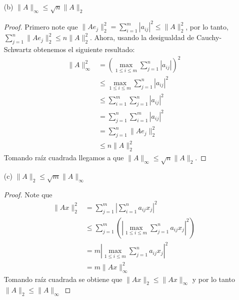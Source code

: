 \begin{enumerate}
\begin{proof}
    Por último, note que las componentes de la diagonal de $A^TA$ son de la forma $u_{jj}=\sum_{i=1}^m a_{ij}^2$, por lo tanto la traza de $A^TA$ es
    \[
    \sum_{j=1}^n\sum_{i=1}^{m}|a_{ij}|^2=\|A\|_F^2
    \]
    y ya que la traza de una matriz es igual a la suma de sus valores propios, y como $A^TA$ es semidefinida positiva, obtenemos que: 
    \begin{align*}
    \lambda_{max}(A^TA)&\leq \text{tr}(A^TA) \\
    \sqrt{\lambda_{max}(A^TA)} & \leq \sqrt{\text{tr}(A^TA)}\\ 
    \|A\|_2\ & \leq \|A\|_F
    \end{align*}
    \end{proof}
    \item[(b)] $\|A\|_\infty \leq \sqrt{n} \|A\|_2$
    \begin{proof}
    Primero note que $\|Ae_j\|_2^2=\sum_{i=1}^m |a_{ij}|^2\leq \|A\|_2^2$, por lo tanto, $\sum_{j=1}^n \|Ae_j\|_2^2\leq n\|A\|_2^2$. Ahora, usando la desigualdad de Cauchy-Schwartz obtenemos el siguiente resultado:
    \begin{align*}
    \|A\|_\infty^{2} & =\left(\max_{1\leq i \leq m}{\sum_{j=1}^n|a_{ij}|}\right)^2\\ 
        &\leq \max_{1\leq i \leq m}{\sum_{j=1}^n|a_{ij}|^2}\\   
        &\leq \sum_{i=1}^m\sum_{j=1}^{n}|a_{ij}|^2\\ 
        &= \sum_{j=1}^n\sum_{i=1}^{m}|a_{ij}|^2\\
        &= \sum_{j=1}^n \|Ae_j\|_2^2\\
        &\leq n\|A\|_2^2
    \end{align*}
    Tomando raíz cuadrada llegamos a que $\|A\|_\infty \leq \sqrt{n}\|A\|_2$.
    \end{proof}
    \item[(c)] $\|A\|_2 \leq \sqrt{m} \|A\|_\infty$
    \begin{proof}
    Note que
    \begin{align*}
    \|Ax\|_2^2 &= \sum_{j=1}^m\left|\sum_{i=1}^n a_{ij}x_{j}\right|^2\\ 
    &\leq \sum_{j=1}^m\left(\left|\max_{1\leq i \leq m}{\sum_{j=1}^n a_{ij}x_{j}}\right|^2\right)\\ 
    &= m\left|\max_{1\leq i \leq m}{\sum_{j=1}^n a_{ij}x_{j}}\right|^2\\ 
    &= m\|Ax\|_\infty^2
    \end{align*}
    Tomando raíz cuadrada se obtiene que $\|Ax\|_2\leq \|Ax\|_\infty$ y por lo tanto $\|A\|_2 \leq \|A\|_\infty$

\end{proof}
\end{enumerate}
